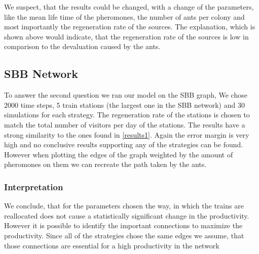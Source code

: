 We suspect, that the results could be changed, with a change of the parameters, like the mean life time of the pheromones, the number of ants per colony and most importantly the regeneration rate of the sources. The explanation, which is shown above would indicate, that the regeneration rate of the sources is low in comparison to the devaluation caused by the ants.

\subsection{SBB Network}
To answer the second question we ran our model on the SBB graph, We chose 2000 time steps, 5 train stations (the largest one in the SBB network) and 30 simulations for each strategy. The regeneration rate of the stations is chosen to match the total number of visitors per day of the stations. The results have a strong similarity to the ones found in \ref{results1}. Again the error margin is very high and no conclusive results supporting any of the strategies can be found. However when plotting the edges of the graph weighted by the amount of pheromones on them we can recreate the path taken by the ants.
\subsubsection{Interpretation}
We conclude, that for the parameters chosen the way, in which the trains are reallocated does not cause a statistically significant change in the productivity. However it is possible to identify the important connections to maximize the productivity. Since all of the strategies chose the same edges we assume, that those connections are essential for a high productivity in the network